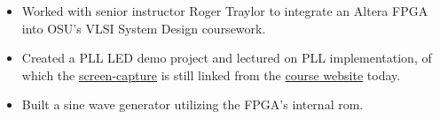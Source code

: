 \documentclass[]{friggeri-cv}
\begin{document}
         \begin{itemize}
           \item Worked with senior instructor Roger Traylor to integrate an Altera FPGA 
                 into OSU's VLSI System Design coursework.
           \item Created a PLL LED demo project and lectured on PLL implementation, of which 
                 the 
                 \href{https://drive.google.com/file/d/0B_A8ZVw8vDrfZHMtQ0pHdFRmeWM/view}{screen-capture} 
                 is still linked from the 
                 \href{http://classes.engr.oregonstate.edu/eecs/spring2016/ece474/}{course website} 
                today.
           \item Built a sine wave generator utilizing the FPGA's internal rom.
         \end{itemize}
\end{document}
